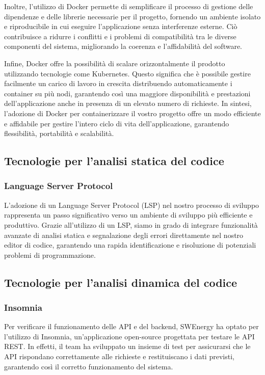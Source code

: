 Inoltre, l'utilizzo di Docker permette di semplificare il processo di gestione
delle dipendenze e delle librerie necessarie per il progetto, fornendo un
ambiente isolato e riproducibile in cui eseguire l'applicazione senza
interferenze esterne. Ciò contribuisce a ridurre i conflitti e i problemi di
compatibilità tra le diverse componenti del sistema, migliorando la coerenza e
l'affidabilità del software.

Infine, Docker offre la possibilità di scalare orizzontalmente il prodotto
utilizzando tecnologie come Kubernetes. Questo significa che è possibile gestire
facilmente un carico di lavoro in crescita distribuendo automaticamente i
container su più nodi, garantendo così una maggiore disponibilità e prestazioni
dell'applicazione anche in presenza di un elevato numero di richieste. In
sintesi, l'adozione di Docker per containerizzare il vostro progetto offre un
modo efficiente e affidabile per gestire l'intero ciclo di vita
dell'applicazione, garantendo flessibilità, portabilità e scalabilità.

\subsection{Tecnologie per l'analisi statica del codice}

\subsubsection{Language Server Protocol}

L'adozione di un Language Server Protocol (LSP) nel nostro processo di sviluppo
rappresenta un passo significativo verso un ambiente di sviluppo più efficiente
e produttivo. Grazie all'utilizzo di un LSP, siamo in grado di integrare
funzionalità avanzate di analisi statica e segnalazione degli errori
direttamente nel nostro editor di codice, garantendo una rapida identificazione
e risoluzione di potenziali problemi di programmazione.

\subsection{Tecnologie per l'analisi dinamica del codice}

\subsubsection{Insomnia}

Per verificare il funzionamento delle API e del backend, SWEnergy ha optato per
l'utilizzo di Insomnia, un'applicazione open-source progettata per testare le
API REST. In effetti, il team ha sviluppato un insieme di test per assicurarsi
che le API rispondano correttamente alle richieste e restituiscano i dati
previsti, garantendo così il corretto funzionamento del sistema.



